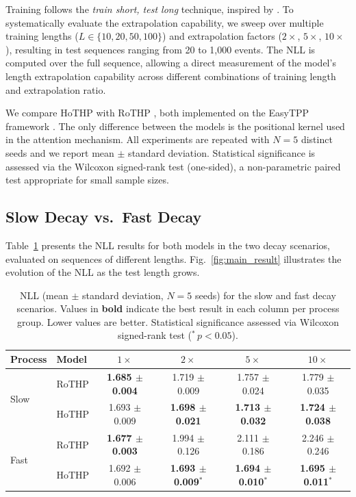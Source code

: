 \documentclass[runningheads]{llncs}
\begin{document}
Training follows the \textit{train short, test long} technique, inspired by \cite{press2022train}. To systematically evaluate the extrapolation capability, we sweep over multiple training lengths ($L \in \{10, 20, 50, 100\}$) and extrapolation factors ($2\times$, $5\times$, $10\times$), resulting in test sequences ranging from 20 to 1{,}000 events. The NLL is computed over the full sequence, allowing a direct measurement of the model's length extrapolation capability across different combinations of training length and extrapolation ratio.

We compare HoTHP with RoTHP \cite{dai2026rothp}, both implemented on the EasyTPP framework \cite{xue2024easytpp}. The only difference between the models is the positional kernel used in the attention mechanism. All experiments are repeated with $N=5$ distinct seeds and we report mean $\pm$ standard deviation. Statistical significance is assessed via the Wilcoxon signed-rank test (one-sided), a non-parametric paired test appropriate for small sample sizes.

\subsection{Slow Decay vs.\ Fast Decay}

Table~\ref{tab:main_results} presents the NLL results for both models in the two decay scenarios, evaluated on sequences of different lengths. Fig.~\ref{fig:main_result} illustrates the evolution of the NLL as the test length grows.

\begin{table}[t]
\centering
\caption{NLL (mean $\pm$ standard deviation, $N=5$ seeds) for the slow and fast decay scenarios. Values in \textbf{bold} indicate the best result in each column per process group. Lower values are better. Statistical significance assessed via Wilcoxon signed-rank test ($^{*}$\,$p<0.05$).}
\label{tab:main_results}
\begin{tabular}{llcccc}
\toprule
Process & Model & $1\times$ & $2\times$ & $5\times$ & $10\times$ \\
\midrule
\multirow{2}{*}{Slow} & RoTHP & \textbf{1.685 $\pm$ 0.004} & 1.719 $\pm$ 0.009 & 1.757 $\pm$ 0.024 & 1.779 $\pm$ 0.035 \\
 & HoTHP & 1.693 $\pm$ 0.009 & \textbf{1.698 $\pm$ 0.021} & \textbf{1.713 $\pm$ 0.032} & \textbf{1.724 $\pm$ 0.038} \\
\midrule
\multirow{2}{*}{Fast} & RoTHP & \textbf{1.677 $\pm$ 0.003} & 1.994 $\pm$ 0.126 & 2.111 $\pm$ 0.186 & 2.246 $\pm$ 0.246 \\
 & HoTHP & 1.692 $\pm$ 0.006 & \textbf{1.693 $\pm$ 0.009}$^{*}$ & \textbf{1.694 $\pm$ 0.010}$^{*}$ & \textbf{1.695 $\pm$ 0.011}$^{*}$ \\
\bottomrule
\end{tabular}
\end{table}
\end{document}
